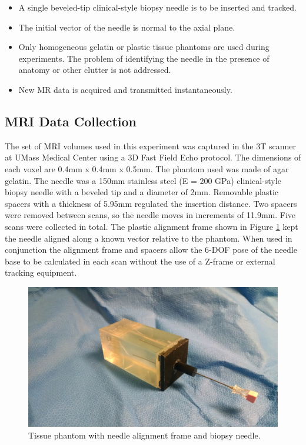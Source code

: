 \begin{itemize}
\item A single beveled-tip clinical-style biopsy needle is to be inserted and tracked.
\item The initial vector of the needle is normal to the axial plane.
\item Only homogeneous gelatin or plastic tissue phantoms are used during experiments. The problem of identifying the needle in the presence of anatomy or other clutter is not addressed.
\item New MR data is acquired and transmitted instantaneously.
\end{itemize}

\subsection{MRI Data Collection}
The set of MRI volumes used in this experiment was captured in the 3T scanner at UMass Medical Center using a 3D Fast Field Echo protocol. The dimensions of each voxel are 0.4mm x 0.4mm x 0.5mm. The phantom used was made of agar gelatin. The needle was a 150mm stainless steel (E = 200 GPa) clinical-style biopsy needle with a beveled tip and a diameter of 2mm. Removable plastic spacers with a thickness of 5.95mm regulated the insertion distance. Two spacers were removed between scans, so the needle moves in increments of 11.9mm. Five scans were collected in total. The plastic alignment frame shown in Figure \ref{fig:needle_guide} kept the needle aligned along a known vector relative to the phantom. When used in conjunction the alignment frame and spacers allow the 6-DOF pose of the needle base to be calculated in each scan without the use of a Z-frame or external tracking equipment.

\begin{figure}[h]
\includegraphics[width=1.0\textwidth]{Fig/chap5/phantom_with_needle_guide_small_2.jpg}
\caption{Tissue phantom with needle alignment frame and biopsy needle.}
\label{fig:needle_guide}
\end{figure}


